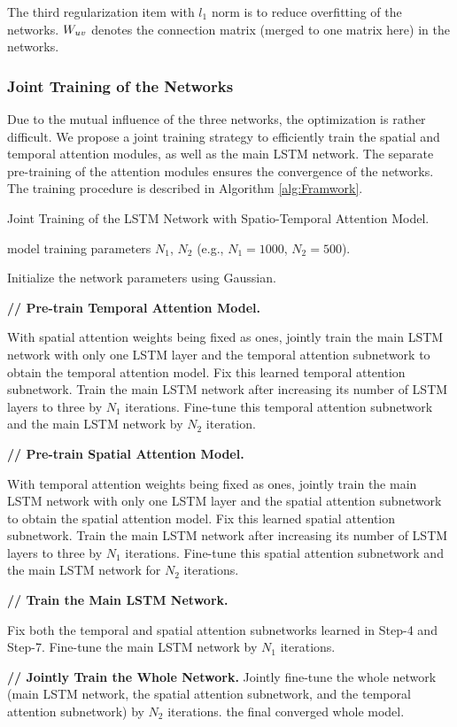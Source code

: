 \documentclass[letterpaper]{article}
\begin{document}
The third regularization item with $l_1$ norm is to reduce overfitting of the networks. ${W}_{u v}$ denotes the connection matrix (merged to one matrix here) in the networks.




\subsubsection{Joint Training of the Networks} Due to the mutual influence of the three networks, the optimization is rather difficult. We propose a joint training strategy to efficiently train the spatial and temporal attention modules, as well as the main LSTM network. The separate pre-training of the attention modules ensures the convergence of the networks. The training procedure is described in Algorithm \ref{alg:Framwork}.
\vspace{-3mm}
\begin{algorithm}[htb]


	\caption{Joint Training of the LSTM Network with Spatio-Temporal Attention Model.}
	\label{alg:Framwork}
	\begin{algorithmic}[1]
	    \REQUIRE model training parameters $N_1$, $N_2$ (e.g., $N_1=1000$, $N_2=500$).


	    \STATE Initialize the network parameters using Gaussian. 

	    \textbf{// Pre-train Temporal Attention Model.}
	     	
		\STATE With spatial attention weights being fixed as ones, jointly train the main LSTM network with only one LSTM layer and the temporal attention subnetwork to obtain the temporal attention model.
		\STATE Fix this learned temporal attention subnetwork. Train the main LSTM network after increasing its number of LSTM layers to three by $N_1$ iterations.
		\STATE Fine-tune this temporal attention subnetwork and the main LSTM network by $N_2$ iteration.
		
		\textbf{// Pre-train Spatial Attention Model.}
		
		\STATE With temporal attention weights being fixed as ones, jointly train the main LSTM network with only one LSTM layer and the spatial attention subnetwork to obtain the spatial attention model.
		\STATE Fix this learned spatial attention subnetwork. Train the main LSTM network after increasing its number of LSTM layers to three by $N_1$ iterations.
		\STATE Fine-tune this spatial attention subnetwork and the main LSTM network for $N_2$ iterations.
		
		\textbf{// Train the Main LSTM Network.}
		
		\STATE Fix both the temporal and spatial attention subnetworks learned in Step-4 and Step-7. Fine-tune the main LSTM network by $N_1$ iterations.
		
		\textbf{// Jointly Train the Whole Network.}
		\STATE Jointly fine-tune the whole network (main LSTM network, the spatial attention subnetwork, and the temporal attention subnetwork) by $N_2$ iterations.
		\ENSURE  the final converged whole model.
	\end{algorithmic}
\end{algorithm}
\vspace{-3mm}
\end{document}
